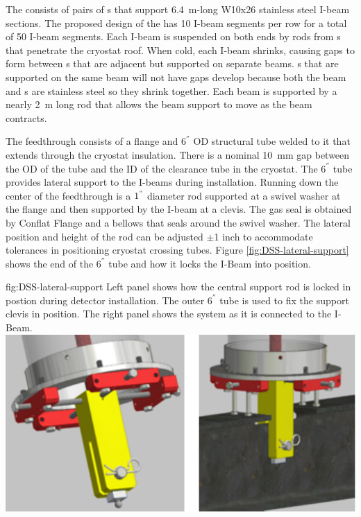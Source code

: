  The 
consists of pairs of \fdth{}s that support \SI{6.4}{m}-long
W10x26 stainless steel I-beam sections. The proposed design of the
 has \num{10} I-beam segments per row for a total of
\num{50} I-beam segments. Each I-beam is suspended on both ends by
rods from \fdth{}s that penetrate the cryostat roof.  %
When cold, each I-beam shrinks, causing gaps to form between
s that are adjacent but supported on separate beams.
s that are supported on the same beam will not have gaps
develop because both the beam and s are stainless steel so
they shrink together.  Each beam is supported by a nearly
\SI{2}{m} long rod that allows the beam support to move as the beam
contracts.


The feedthrough consists of a flange and $6 ^{''}$ OD structural tube welded to it that extends through the cryostat insulation.  
There is a
nominal \SI{10}{mm} gap between the OD of the tube and the ID of the clearance tube in the cryostat. 
The $6 ^{''}$ tube provides lateral support to the I-beams during installation.
Running down the center of the feedthrough is a $1^{"}$ diameter rod supported at a swivel washer at the flange and then supported by the
I-beam at a clevis.  The gas seal is obtained by Conflat Flange and a
bellows that seals around the swivel washer.  The lateral position and height of the rod can be adjusted $\pm$1 inch to accommodate tolerances in positioning cryostat crossing tubes. Figure \ref{fig:DSS-lateral-support} shows the end of the $6 ^{''}$ tube and how it locks the I-Beam into position. 

\begin{dunefigure}{fig:DSS-lateral-support}
  {Left panel shows how the central support rod is locked in postion during detector installation. The outer $6 ^{''}$ tube is used to fix the support clevis in position. The right panel shows the system as it is connected to the I-Beam.}
\includegraphics[width=.75\textwidth]{graphics/dss-lateral-support.pdf}
\end{dunefigure}

